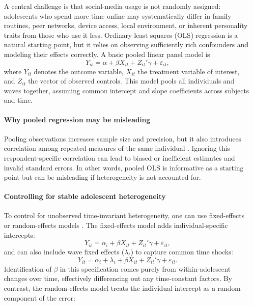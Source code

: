 \documentclass[11pt,oneside,a4paper]{book}
\begin{document}
A central challenge is that social-media usage is not randomly assigned: adolescents who spend more time online may systematically differ in family routines, peer networks, device access, local environment, or inherent personality traits from those who use it less. Ordinary least squares (OLS) regression is a natural starting point, but it relies on observing sufficiently rich confounders and modeling their effects correctly. A basic pooled linear panel model is
\begin{equation*}
Y_{it} = \alpha + \beta X_{it} + Z_{it}'\gamma + \varepsilon_{it},
\end{equation*}
where \(Y_{it}\) denotes the outcome variable, \(X_{it}\) the treatment variable of interest, and \(Z_{it}\) the vector of observed controls. This model pools all individuals and waves together, assuming common intercept and slope coefficients across subjects and time.\\
\\
\textbf{Why pooled regression may be misleading}\\
\\
Pooling observations increases sample size and precision, but it also introduces correlation among repeated measures of the same individual \citep{ward1993pooled}. Ignoring this respondent-specific correlation can lead to biased or inefficient estimates and invalid standard errors. In other words, pooled OLS is informative as a starting point but can be misleading if heterogeneity is not accounted for.\\
\\
\textbf{Controlling for stable adolescent heterogeneity}\\
\\
To control for unobserved time-invariant heterogeneity, one can use fixed-effects or random-effects models \citep{ward1993pooled,baltagi2013panel}. The fixed-effects model adds individual-specific intercepts:
\begin{equation*}
Y_{it} = \alpha_i + \beta X_{it} + Z_{it}'\gamma + \varepsilon_{it},
\end{equation*}
and can also include wave fixed effects ($\lambda_t$) to capture common time shocks:
\begin{equation*}
Y_{it} = \alpha_i + \lambda_t + \beta X_{it} + Z_{it}'\gamma + \varepsilon_{it}.
\end{equation*}
Identification of $\beta$ in this specification comes purely from within-adolescent changes over time, effectively differencing out any time-constant factors. By contrast, the random-effects model treats the individual intercept as a random component of the error:
\end{document}
